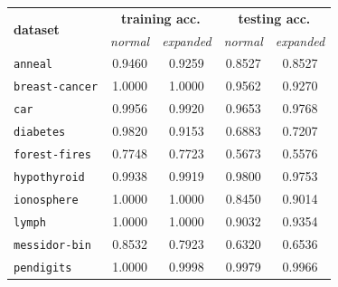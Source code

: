 \documentclass[12pt]{report}
\theoremstyle{definition}
\theoremstyle{definition}
\theoremstyle{definition}
\begin{document}
\begin{table}[ht]
    \centering
    \begin{tabular}{lcccc}
    \hline
    \multicolumn{1}{l}{\multirow{2}{*}{\bf dataset}} & \multicolumn{2}{c}{\bf training acc.} & \multicolumn{2}{c}{\bf testing acc.} \\
    \multicolumn{1}{l}{} & \multicolumn{1}{p{2cm}}{\centering \it normal} & \multicolumn{1}{p{2cm}}{\centering \it expanded} & \multicolumn{1}{p{2cm}}{\centering \it normal} & \multicolumn{1}{p{2cm}}{\centering \it expanded} \\
    \hline
    \multicolumn{1}{l}{\tt anneal}        & \multicolumn{1}{c}{0.9460} & \multicolumn{1}{c}{0.9259} & \multicolumn{1}{c}{0.8527} & \multicolumn{1}{c}{0.8527} \\
    \multicolumn{1}{l}{\tt breast-cancer} & \multicolumn{1}{c}{1.0000} & \multicolumn{1}{c}{1.0000} & \multicolumn{1}{c}{0.9562} & \multicolumn{1}{c}{0.9270} \\
    \multicolumn{1}{l}{\tt car}           & \multicolumn{1}{c}{0.9956} & \multicolumn{1}{c}{0.9920} & \multicolumn{1}{c}{0.9653} & \multicolumn{1}{c}{0.9768} \\
    \multicolumn{1}{l}{\tt diabetes}      & \multicolumn{1}{c}{0.9820} & \multicolumn{1}{c}{0.9153} & \multicolumn{1}{c}{0.6883} & \multicolumn{1}{c}{0.7207} \\
    \multicolumn{1}{l}{\tt forest-fires}  & \multicolumn{1}{c}{0.7748} & \multicolumn{1}{c}{0.7723} & \multicolumn{1}{c}{0.5673} & \multicolumn{1}{c}{0.5576} \\
    \multicolumn{1}{l}{\tt hypothyroid}   & \multicolumn{1}{c}{0.9938} & \multicolumn{1}{c}{0.9919} & \multicolumn{1}{c}{0.9800} & \multicolumn{1}{c}{0.9753} \\
    \multicolumn{1}{l}{\tt ionosphere}    & \multicolumn{1}{c}{1.0000} & \multicolumn{1}{c}{1.0000} & \multicolumn{1}{c}{0.8450} & \multicolumn{1}{c}{0.9014} \\
    \multicolumn{1}{l}{\tt lymph}         & \multicolumn{1}{c}{1.0000} & \multicolumn{1}{c}{1.0000} & \multicolumn{1}{c}{0.9032} & \multicolumn{1}{c}{0.9354} \\
    \multicolumn{1}{l}{\tt messidor-bin}  & \multicolumn{1}{c}{0.8532} & \multicolumn{1}{c}{0.7923} & \multicolumn{1}{c}{0.6320} & \multicolumn{1}{c}{0.6536} \\
    \multicolumn{1}{l}{\tt pendigits}     & \multicolumn{1}{c}{1.0000} & \multicolumn{1}{c}{0.9998} & \multicolumn{1}{c}{0.9979} & \multicolumn{1}{c}{0.9966} \\

\end{tabular}
\end{table}
\end{document}
